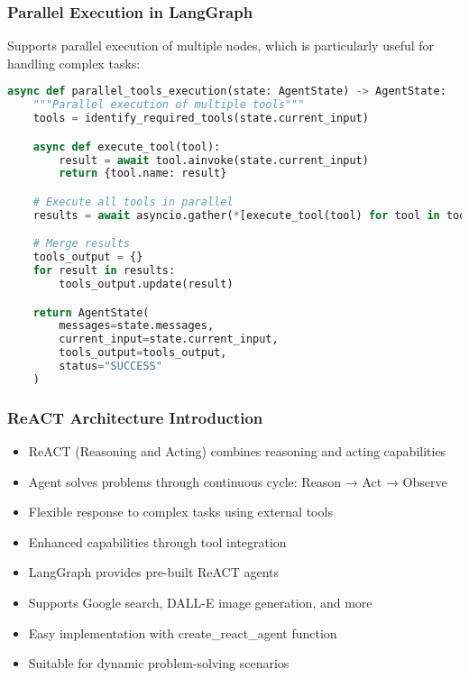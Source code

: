 \begin{frame}[fragile]\frametitle{Parallel Execution in LangGraph}
Supports parallel execution of multiple nodes, which is particularly useful for handling complex tasks:

      \begin{lstlisting}[language=Python, basicstyle=\tiny]
async def parallel_tools_execution(state: AgentState) -> AgentState:
    """Parallel execution of multiple tools"""
    tools = identify_required_tools(state.current_input)

    async def execute_tool(tool):
        result = await tool.ainvoke(state.current_input)
        return {tool.name: result}

    # Execute all tools in parallel
    results = await asyncio.gather(*[execute_tool(tool) for tool in tools])

    # Merge results
    tools_output = {}
    for result in results:
        tools_output.update(result)

    return AgentState(
        messages=state.messages,
        current_input=state.current_input,
        tools_output=tools_output,
        status="SUCCESS"
    )
      \end{lstlisting}
\end{frame}


\begin{frame}[fragile]\frametitle{ReACT Architecture Introduction}
      \begin{itemize}
        \item ReACT (Reasoning and Acting) combines reasoning and acting capabilities
        \item Agent solves problems through continuous cycle: Reason → Act → Observe
        \item Flexible response to complex tasks using external tools
        \item Enhanced capabilities through tool integration
        \item LangGraph provides pre-built ReACT agents
        \item Supports Google search, DALL-E image generation, and more
        \item Easy implementation with create\_react\_agent function
        \item Suitable for dynamic problem-solving scenarios
      \end{itemize}
\end{frame}

